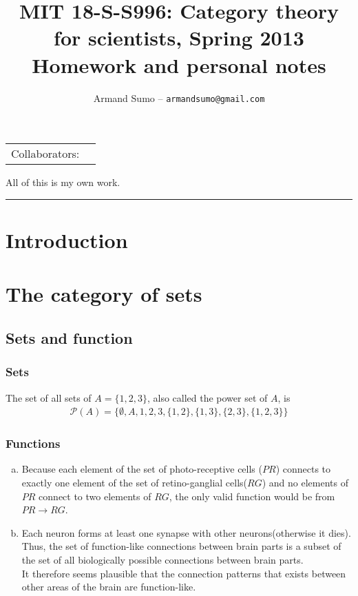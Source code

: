 \documentclass[12pt]{article}
\title{MIT 18-S-S996: Category theory for scientists, Spring 2013  \\ Homework and personal notes}
\author{Armand Sumo -- \texttt{armandsumo@gmail.com}}
\theoremstyle{remark}
\theoremstyle{definition}
\def\sexc{\begin{enumerate}[a.)]\setlength{\itemsep}{.1cm}\setlength{\parskip}{.1cm}\item}
\def\next{\item}
\def\endsexc{\end{enumerate}}
\begin{document}
\begin{large}
  \maketitle
  \begin{center}

  \vspace{-0.3in}
  \begin{tabular}{rl}
  Collaborators: & 
  \end{tabular}
  \end{center}

All of this is my own work.

\noindent
\rule{\linewidth}{0.4pt}
\section{Introduction}
\section{The category of sets}
\subsection{Sets and function}
\subsubsection{Sets}\label{sec:sets}
\begin{Exercise}
The set of all sets of $A=\{1,2,3\}$, also called the power set of $A$, is \begin{align*}\mathcal{P}(A)=\{\emptyset,A,1,2,3,\{1,2\},\{1,3\},\{2,3\},\{1,2,3\}\} \end{align*}
\end{Exercise}
\subsubsection{Functions}\label{sec:funcs}
\begin{Exercise}
\sexc
Because each element of the set of photo-receptive cells ($PR$) connects to exactly one element of the set of retino-ganglial cells($RG$) and no elements of $PR$ connect to two elements of $RG$,  the only valid function would be from $PR\rightarrow RG $. 
\next Each neuron forms at least one synapse with other neurons(otherwise it dies). Thus, the set of function-like connections between brain parts is a subset of the set of all biologically possible connections between brain parts.\\ It therefore seems plausible that the connection patterns that exists between other areas of the brain are function-like.
\endsexc
\end{Exercise}


\end{large}
\end{document}
